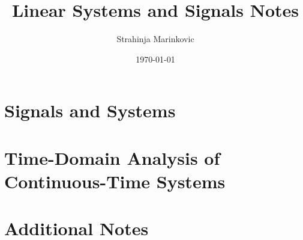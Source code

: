 \documentclass[12pt, openany]{book}
\title{\textbf{Linear Systems and Signals Notes}}
\author{Strahinja Marinkovic}
\date{\today}
\theoremstyle{definition}
\theoremstyle{remark}
\begin{document}
\maketitle

\tableofcontents

\chapter{Signals and Systems}


\chapter{Time-Domain Analysis of Continuous-Time Systems}


\chapter{Additional Notes}

\end{document}
